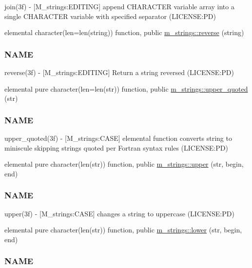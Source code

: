 \begin{DoxyCompactItemize}
\begin{DoxyCompactList}
join(3f) -\/ \mbox{[}M\+\_\+strings\+:E\+D\+I\+T\+I\+NG\mbox{]} append C\+H\+A\+R\+A\+C\+T\+ER variable array into a single C\+H\+A\+R\+A\+C\+T\+ER variable with specified separator (L\+I\+C\+E\+N\+SE\+:PD) \end{DoxyCompactList}\item 
elemental character(len=len(string)) function, public \mbox{\hyperlink{namespacem__strings_ab3e5e7af9e9594fdb544f82736a26f17}{m\+\_\+strings\+::reverse}} (string)
\begin{DoxyCompactList}\small\item\em \subsubsection*{N\+A\+ME}

reverse(3f) -\/ \mbox{[}M\+\_\+strings\+:E\+D\+I\+T\+I\+NG\mbox{]} Return a string reversed (L\+I\+C\+E\+N\+SE\+:PD) \end{DoxyCompactList}\item 
elemental pure character(len=len(str)) function, public \mbox{\hyperlink{namespacem__strings_a3bd3b1de054c81fcc18b69afc369fb21}{m\+\_\+strings\+::upper\+\_\+quoted}} (str)
\begin{DoxyCompactList}\small\item\em \subsubsection*{N\+A\+ME}

upper\+\_\+quoted(3f) -\/ \mbox{[}M\+\_\+strings\+:C\+A\+SE\mbox{]} elemental function converts string to miniscule skipping strings quoted per Fortran syntax rules (L\+I\+C\+E\+N\+SE\+:PD) \end{DoxyCompactList}\item 
elemental pure character(len(str)) function, public \mbox{\hyperlink{namespacem__strings_a0953ac5c4d31339fdd8ec3acc9c3c915}{m\+\_\+strings\+::upper}} (str, begin, end)
\begin{DoxyCompactList}\small\item\em \subsubsection*{N\+A\+ME}

upper(3f) -\/ \mbox{[}M\+\_\+strings\+:C\+A\+SE\mbox{]} changes a string to uppercase (L\+I\+C\+E\+N\+SE\+:PD) \end{DoxyCompactList}\item 
elemental pure character(len(str)) function, public \mbox{\hyperlink{namespacem__strings_a3c7d4be9051206e4b2f72112f9fdc3b4}{m\+\_\+strings\+::lower}} (str, begin, end)
\begin{DoxyCompactList}\small\item\em \subsubsection*{N\+A\+ME}


\end{DoxyCompactList}
\end{DoxyCompactItemize}
